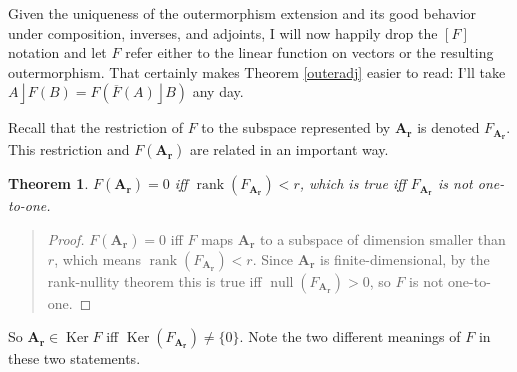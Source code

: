 \documentclass{utarticle}
\newcommand{\bl}[1]{\ensuremath{\bm{#1}}}
\DeclareMathOperator{\lin}{\rfloor}
\newcommand{\Ker}{\operatorname{Ker}}
\newcommand{\rank}{\operatorname{rank}}
\newcommand{\nullity}{\operatorname{null}}
\newcommand{\adj}[1]{\ensuremath{\overline{#1}}}
\newcommand{\Out}[1]{\ensuremath{\left[#1\right]}}
\newtheorem{thm}{Theorem}
\newcommand{\bp}{\begin{quotation} \begin{proof}}
\newcommand{\ep}{\end{proof} \end{quotation}}
\begin{document}
Given the uniqueness of the outermorphism extension and its good behavior under composition, 
inverses, and adjoints, I will now happily drop the \Out{F} notation and let $F$ refer 
either to the linear function on vectors or the resulting outermorphism.  That certainly makes  
Theorem \ref{outeradj} easier to read: I'll take $A \lin F(B) = F\left(\adj{F}(A) \lin B\right)$ any day.

Recall that the restriction of $F$ to the subspace represented by \bl{A_r} is denoted $F_{\bl{A_r}}$.
This restriction and $F(\bl{A_r})$ are related in an important way.

\begin{thm}
$F(\bl{A_r}) = 0$ iff $\rank(F_{\bl{A_r}}) < r$, which is true iff $F_{\bl{A_r}}$ is not one-to-one. 
\label{Fbleq0}
\end{thm}
\bp
$F(\bl{A_r}) = 0$ iff $F$ maps \bl{A_r} to a subspace of dimension smaller than $r$, which means
$\rank(F_{\bl{A_r}}) < r$.  Since \bl{A_r} is finite-dimensional, by the rank-nullity theorem this is true
iff $\nullity(F_{\bl{A_r}}) > 0$, so $F$ is not one-to-one.
\ep
So $\bl{A_r} \in \Ker{F}$ iff $\Ker(F_{\bl{A_r}}) \neq \{0\}$.  Note the two different meanings of $F$
in these two statements.
\end{document}
